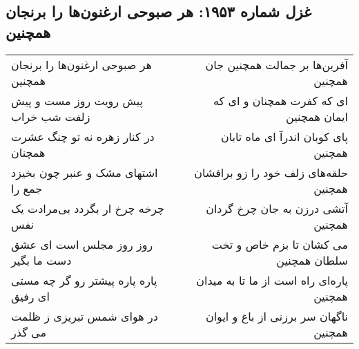\begin{center}
\section*{غزل شماره ۱۹۵۳: هر صبوحی ارغنون‌ها را برنجان همچنین}
\label{sec:1953}
\begin{longtable}{l p{0.5cm} r}
هر صبوحی ارغنون‌ها را برنجان همچنین
&&
آفرین‌ها بر جمالت همچنین جان همچنین
\\
پیش رویت روز مست و پیش زلفت شب خراب
&&
ای که کفرت همچنان و ای که ایمان همچنین
\\
در کنار زهره نه تو چنگ عشرت همچنان
&&
پای کوبان اندرآ ای ماه تابان همچنین
\\
اشتهای مشک و عنبر چون بخیزد جمع را
&&
حلقه‌های زلف خود را زو برافشان همچنین
\\
چرخه چرخ ار بگردد بی‌مرادت یک نفس
&&
آتشی درزن به جان چرخ گردان همچنین
\\
روز روز مجلس است ای عشق دست ما بگیر
&&
می کشان تا بزم خاص و تخت سلطان همچنین
\\
پاره پاره پیشتر رو گر چه مستی ای رفیق
&&
پاره‌ای راه است از ما تا به میدان همچنین
\\
در هوای شمس تبریزی ز ظلمت می گذر
&&
ناگهان سر برزنی از باغ و ایوان همچنین
\\
\end{longtable}
\end{center}
